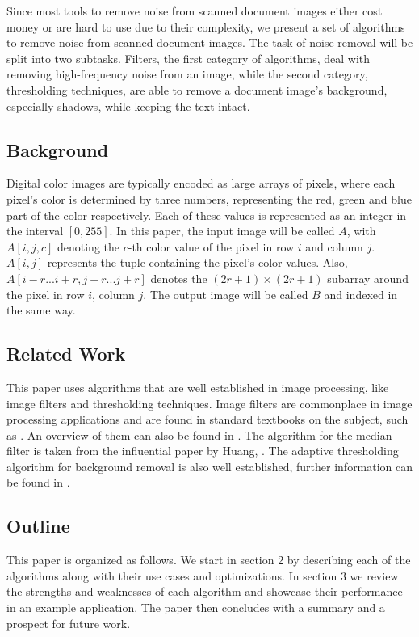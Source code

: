 \documentclass[sigconf]{acmart}
\begin{document}
Since most tools to remove noise from scanned document images either cost money or are hard to use due to their complexity, we present a set of algorithms to remove noise from scanned document images. The task of noise removal will be split into two subtasks. Filters, the first category of algorithms, deal with removing high-frequency noise from an image, while the second category, thresholding techniques, are able to remove a document image's background, especially shadows, while keeping the text intact.


\subsection{Background}
Digital color images are typically encoded as large arrays of pixels, where each pixel's color is determined by three numbers, representing the red, green and blue part of the color respectively. Each of these values is represented as an integer in the interval $[0, 255]$. In this paper, the input image will be called $A$, with $A[i,j,c]$ denoting the $c$-th color value of the pixel in row $i$ and column $j$. $A[i,j]$ represents the tuple containing the pixel's color values. Also, $A[i-r...i+r, j-r...j+r]$ denotes the $(2r+1) \times (2r+1)$ subarray around the pixel in row $i$, column $j$. The output image will be called $B$ and indexed in the same way.

\subsection{Related Work}
This paper uses algorithms that are well established in image processing, like image filters and thresholding techniques. Image filters are commonplace in image processing applications and are found in standard textbooks on the subject, such as \cite{overview_book}. An overview of them can also be found in \cite{overview_paper}. The algorithm for the median filter is taken from the influential paper by Huang, \cite{huang}. The adaptive thresholding algorithm for background removal is also well established, further information can be found in \cite{thresholding}.

\subsection{Outline}
This paper is organized as follows. We start in section 2 by describing each of the algorithms along with their use cases and optimizations. In section 3 we review the strengths and weaknesses of each algorithm and showcase their performance in an example application. The paper then concludes with a summary and a prospect for future work.
\end{document}
